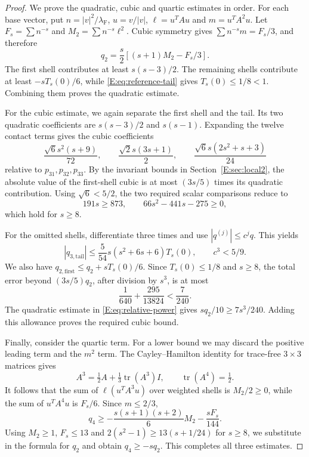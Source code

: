 \documentclass[reqno,english]{amsart}
\theoremstyle{definition}
\newtheorem{open problem}[theorem]{Open Problem}
\theoremstyle{remark}
\theoremstyle{plain}
\numberwithin{equation}{section}
\newcommand{\tr}{\operatorname{tr}}
\newcommand{\lam}{\lambda_{\mathrm F}}
\begin{document}
\begin{proof}
We prove the quadratic, cubic and quartic estimates in order.
For each base vector, put $n=|v|^2/\lam$, $u=v/|v|$,
$\ell=u^TAu$ and $m=u^TA^2u$. Let $F_s=\sum n^{-s}$ and
$M_2=\sum n^{-s}\ell^2$. Cubic symmetry gives
$\sum n^{-s}m=F_s/3$, and therefore
\[
 q_2=\frac s2[(s+1)M_2-F_s/3].
\]
The first shell contributes at least $s(s-3)/2$. The remaining
shells contribute at least $-sT_s(0)/6$, while
\eqref{E:eq:reference-tail} gives $T_s(0)\le1/8<1$.
Combining them proves the quadratic estimate.

For the cubic estimate, we again separate the first shell and the
tail. Its two quadratic coefficients are $s(s-3)/2$ and
$s(s-1)$. Expanding the twelve contact terms gives the cubic
coefficients
\begin{equation}
 \frac{\sqrt6s^2(s+9)}{72},\qquad
 \frac{\sqrt2s(3s+1)}2,\qquad
 \frac{\sqrt6s(2s^2+s+3)}{24}
 \label{E:eq:power-cubic-coeff}
\end{equation}
relative to $p_{31},p_{32},p_{33}$. By the invariant bounds in
Section~\ref{E:sec:local2}, the absolute value of the first-shell
cubic is at most $(3s/5)$ times its quadratic contribution.
Using $\sqrt6<5/2$, the two required scalar comparisons reduce to
\[
 191s\ge873,\qquad 66s^2-441s-275\ge0,
\]
which hold for $s\ge8$.

For the omitted shells, differentiate three times and use
$|q^{(j)}|\le c^j q$. This yields
\[
 |q_{3,\mathrm{tail}}|\le\frac5{54}s(s^2+6s+6)T_s(0),\qquad c^3<5/9.
\]
We also have $q_{2,\mathrm{first}}\le q_2+sT_s(0)/6$.
Since $T_s(0)\le1/8$ and $s\ge8$, the total error beyond
$(3s/5)q_2$, after division by $s^3$, is at most
\[
 \frac1{640}+\frac{295}{13824}<\frac7{240}.
\]
The quadratic estimate in \eqref{E:eq:relative-power} gives
$sq_2/10\ge7s^3/240$. Adding this allowance proves the required
cubic bound.

Finally, consider the quartic term. For a lower bound we may discard
the positive leading term and the $m^2$ term. The Cayley--Hamilton
identity for trace-free $3\times3$ matrices gives
\[
 A^3=\tfrac12A+\tfrac13\tr(A^3)I,\qquad\tr(A^4)=\tfrac12.
\]
It follows that the sum of $\ell(u^TA^3u)$ over weighted shells is $M_2/2\ge0$, while the sum of $u^TA^4u$ is $F_s/6$. Since $m\le2/3$,
\[
 q_4\ge-\frac{s(s+1)(s+2)}6M_2-\frac{sF_s}{144}.
\]
Using $M_2\ge1$, $F_s\le13$ and
$2(s^2-1)\ge13(s+1/24)$ for $s\ge8$, we substitute in the
formula for $q_2$ and obtain $q_4\ge-sq_2$.
This completes all three estimates.
\end{proof}
\end{document}
